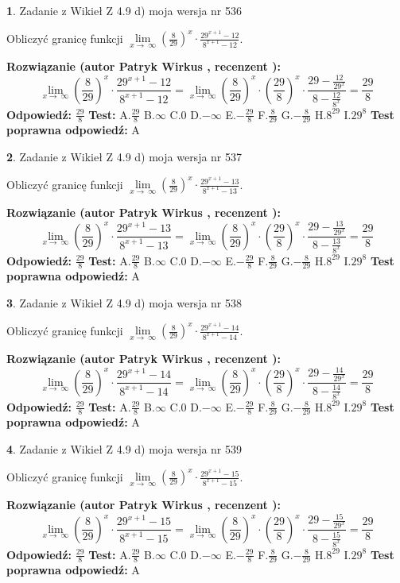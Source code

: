 \documentclass[12pt, a4paper]{article}
\theoremstyle{definition} %
\newtheorem{zad}{}
\newcommand{\zadStart}[1]{\begin{zad}#1\newline}
\newcommand{\zadStop}{\end{zad}}
\newcommand{\rozwStart}[2]{\noindent \textbf{Rozwiązanie (autor #1 , recenzent #2): }\newline}
\newcommand{\rozwStop}{\newline}
\newcommand{\odpStart}{\noindent \textbf{Odpowiedź:}\newline}
\newcommand{\odpStop}{\newline}
\newcommand{\testStart}{\noindent \textbf{Test:}\newline}
\newcommand{\testStop}{\newline}
\newcommand{\kluczStart}{\noindent \textbf{Test poprawna odpowiedź:}\newline}
\newcommand{\kluczStop}{\newline}
\begin{document}
\zadStart{Zadanie z Wikieł Z 4.9 d) moja wersja nr 536}


Obliczyć granicę funkcji  $\lim\limits_{x\to\ \infty}(\frac{8}{29})^{x}\cdot\frac{29^{x+1}-12}{8^{x+1}-12}$.
\zadStop
\rozwStart{Patryk Wirkus}{}
$$\lim\limits_{x\to\ \infty}(\frac{8}{29})^{x}\cdot\frac{29^{x+1}-12}{8^{x+1}-12}=\lim\limits_{x\to\ \infty}(\frac{8}{29})^{x}\cdot(\frac{29}{8})^{x} \cdot \frac{29-\frac{12}{29^{x}}}{8-\frac{12}{8^{x}}} = \frac{29}{8}$$
\rozwStop
\odpStart
$\frac{29}{8}$
\odpStop
\testStart
A.$\frac{29}{8}$ B.$\infty$ C.$0$ D.$-\infty$ E.$-\frac{29}{8}$
F.$\frac{8}{29}$ G.$-\frac{8}{29}$
H.$8^{29}$
I.$29^{8}$
\testStop
\kluczStart
A
\kluczStop



\zadStart{Zadanie z Wikieł Z 4.9 d) moja wersja nr 537}


Obliczyć granicę funkcji  $\lim\limits_{x\to\ \infty}(\frac{8}{29})^{x}\cdot\frac{29^{x+1}-13}{8^{x+1}-13}$.
\zadStop
\rozwStart{Patryk Wirkus}{}
$$\lim\limits_{x\to\ \infty}(\frac{8}{29})^{x}\cdot\frac{29^{x+1}-13}{8^{x+1}-13}=\lim\limits_{x\to\ \infty}(\frac{8}{29})^{x}\cdot(\frac{29}{8})^{x} \cdot \frac{29-\frac{13}{29^{x}}}{8-\frac{13}{8^{x}}} = \frac{29}{8}$$
\rozwStop
\odpStart
$\frac{29}{8}$
\odpStop
\testStart
A.$\frac{29}{8}$ B.$\infty$ C.$0$ D.$-\infty$ E.$-\frac{29}{8}$
F.$\frac{8}{29}$ G.$-\frac{8}{29}$
H.$8^{29}$
I.$29^{8}$
\testStop
\kluczStart
A
\kluczStop



\zadStart{Zadanie z Wikieł Z 4.9 d) moja wersja nr 538}


Obliczyć granicę funkcji  $\lim\limits_{x\to\ \infty}(\frac{8}{29})^{x}\cdot\frac{29^{x+1}-14}{8^{x+1}-14}$.
\zadStop
\rozwStart{Patryk Wirkus}{}
$$\lim\limits_{x\to\ \infty}(\frac{8}{29})^{x}\cdot\frac{29^{x+1}-14}{8^{x+1}-14}=\lim\limits_{x\to\ \infty}(\frac{8}{29})^{x}\cdot(\frac{29}{8})^{x} \cdot \frac{29-\frac{14}{29^{x}}}{8-\frac{14}{8^{x}}} = \frac{29}{8}$$
\rozwStop
\odpStart
$\frac{29}{8}$
\odpStop
\testStart
A.$\frac{29}{8}$ B.$\infty$ C.$0$ D.$-\infty$ E.$-\frac{29}{8}$
F.$\frac{8}{29}$ G.$-\frac{8}{29}$
H.$8^{29}$
I.$29^{8}$
\testStop
\kluczStart
A
\kluczStop



\zadStart{Zadanie z Wikieł Z 4.9 d) moja wersja nr 539}


Obliczyć granicę funkcji  $\lim\limits_{x\to\ \infty}(\frac{8}{29})^{x}\cdot\frac{29^{x+1}-15}{8^{x+1}-15}$.
\zadStop
\rozwStart{Patryk Wirkus}{}
$$\lim\limits_{x\to\ \infty}(\frac{8}{29})^{x}\cdot\frac{29^{x+1}-15}{8^{x+1}-15}=\lim\limits_{x\to\ \infty}(\frac{8}{29})^{x}\cdot(\frac{29}{8})^{x} \cdot \frac{29-\frac{15}{29^{x}}}{8-\frac{15}{8^{x}}} = \frac{29}{8}$$
\rozwStop
\odpStart
$\frac{29}{8}$
\odpStop
\testStart
A.$\frac{29}{8}$ B.$\infty$ C.$0$ D.$-\infty$ E.$-\frac{29}{8}$
F.$\frac{8}{29}$ G.$-\frac{8}{29}$
H.$8^{29}$
I.$29^{8}$
\testStop
\kluczStart
A
\kluczStop
\end{document}
